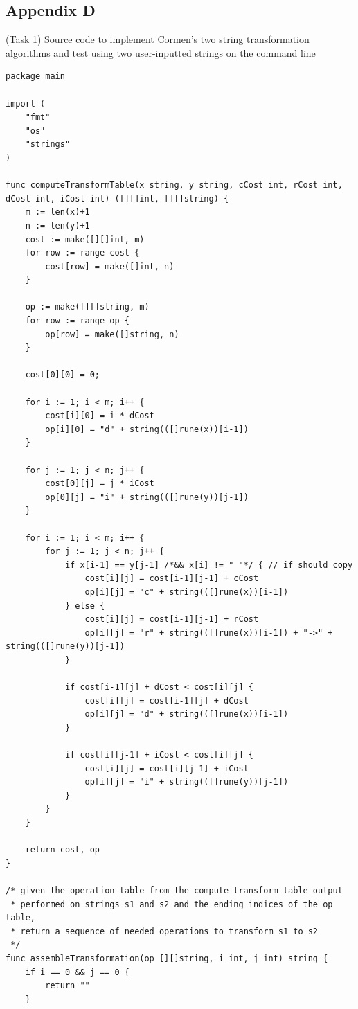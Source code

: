 \documentclass[12pt,letterpaper]{article}
\begin{document}
\subsection*{Appendix D}
    (Task 1) Source code to implement Cormen's two string transformation algorithms and test using two user-inputted strings on the command line
    \begin{scriptsize}
        \begin{verbatim}
package main

import (
    "fmt"
    "os"
    "strings"
)

func computeTransformTable(x string, y string, cCost int, rCost int, dCost int, iCost int) ([][]int, [][]string) {
    m := len(x)+1
    n := len(y)+1
    cost := make([][]int, m)
    for row := range cost {
        cost[row] = make([]int, n)
    }

    op := make([][]string, m)
    for row := range op {
        op[row] = make([]string, n)
    }

    cost[0][0] = 0;

    for i := 1; i < m; i++ {
        cost[i][0] = i * dCost
        op[i][0] = "d" + string(([]rune(x))[i-1]) 
    }

    for j := 1; j < n; j++ {
        cost[0][j] = j * iCost
        op[0][j] = "i" + string(([]rune(y))[j-1]) 
    }

    for i := 1; i < m; i++ {
        for j := 1; j < n; j++ {
            if x[i-1] == y[j-1] /*&& x[i] != " "*/ { // if should copy
                cost[i][j] = cost[i-1][j-1] + cCost
                op[i][j] = "c" + string(([]rune(x))[i-1])
            } else {
                cost[i][j] = cost[i-1][j-1] + rCost
                op[i][j] = "r" + string(([]rune(x))[i-1]) + "->" + string(([]rune(y))[j-1])
            }

            if cost[i-1][j] + dCost < cost[i][j] {
                cost[i][j] = cost[i-1][j] + dCost
                op[i][j] = "d" + string(([]rune(x))[i-1])
            }

            if cost[i][j-1] + iCost < cost[i][j] {
                cost[i][j] = cost[i][j-1] + iCost
                op[i][j] = "i" + string(([]rune(y))[j-1])
            }
        }
    }

    return cost, op
}

/* given the operation table from the compute transform table output
 * performed on strings s1 and s2 and the ending indices of the op table,
 * return a sequence of needed operations to transform s1 to s2
 */
func assembleTransformation(op [][]string, i int, j int) string {
    if i == 0 && j == 0 {
        return ""
    }


\end{verbatim}
\end{scriptsize}
\end{document}
